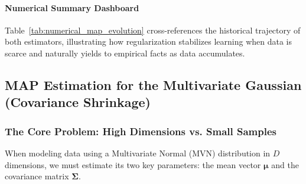 \documentclass{article}
\begin{document}
\paragraph{Numerical Summary Dashboard}
Table~\ref{tab:numerical_map_evolution} cross-references the historical trajectory of both estimators, illustrating how regularization stabilizes learning when data is scarce and naturally yields to empirical facts as data accumulates.

\begin{table}[htbp]
\centering
\small
{}
\caption{Numerical Trace Matrix Comparing MLE and Laplace-Smoothed MAP Estimators Across Data Lifecycles}
\label{tab:numerical_map_evolution}
\end{table}

\subsection{MAP Estimation for the Multivariate Gaussian (Covariance Shrinkage)}

\subsubsection{The Core Problem: High Dimensions vs. Small Samples}
When modeling data using a Multivariate Normal ($\text{MVN}$) distribution in $D$ dimensions, we must estimate its two key parameters: the mean vector $\boldsymbol{\mu}$ and the covariance matrix $\boldsymbol{\Sigma}$. 
\end{document}
